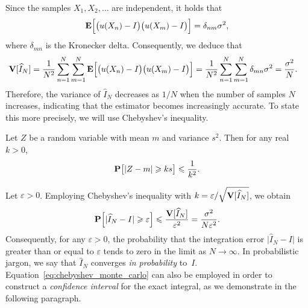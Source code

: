 Since the samples $X_1, X_2, \dotsc$ are independent,
it holds that
\[
    \mathbf E\Bigl[\bigl(u(X_n) - I\bigr) \bigl(u(X_m) - I\bigr)\Bigr] = \delta_{nm} \sigma^2,
\]
where $\delta_{mn}$ is the Kronecker delta.
Consequently, we deduce that
\begin{align*}
    \mathbf V[\widehat I_N]
    &=  \frac{1}{N^2} \sum_{n=1}^{N} \sum_{m=1}^{N} \mathbf E \Bigl[ \bigl(u(X_n) - I\bigr) \bigl(u(X_m) - I\bigr) \Bigr]
    =  \frac{1}{N^2} \sum_{n=1}^{N} \sum_{m=1}^{N} \delta_{mn} \sigma^2 = \frac{\sigma^2}{N}.
\end{align*}
Therefore, the variance of $\widehat I_N$ decreases as $1/N$ when the number of samples $N$ increases,
indicating that the estimator becomes increasingly accurate.
To state this more precisely,
we will use Chebyshev's inequality.
\begin{theorem}
    Let $Z$ be a random variable with mean $m$ and variance $s^2$.
    Then for any real $k > 0$,
    \[
        \mathbf P \bigl[ |Z - m|  \geqslant k s \bigr] \leqslant \frac{1}{k^2}.
    \]
\end{theorem}
Let $\varepsilon > 0$.
Employing Chebyshev's inequality with $k = \varepsilon / \sqrt{\mathbf V[\widehat I_N]}$,
we obtain
\begin{equation}
    \label{eq:chebyshev_monte_carlo}
    \mathbf P\Bigl[\lvert \widehat I_N - I \rvert \geqslant \varepsilon \Bigr]
    \leqslant \frac{\mathbf V[\widehat I_N]}{\varepsilon^2}
    = \frac{\sigma^2}{N \varepsilon^2}.
\end{equation}
Consequently, for any $\varepsilon > 0$,
the probability that the integration error $\bigl\lvert \widehat I_N - I \bigr\rvert$ is greater than or equal to $\varepsilon$ tends to zero in the limit as $N \to \infty$.
In probabilistic jargon, we say that $\widehat I_N$ converges \emph{in probability} to~$I$.
Equation~\eqref{eq:chebyshev_monte_carlo} can also be employed in order to construct a \emph{confidence interval} for the exact integral,
as we demonstrate in the following paragraph.

